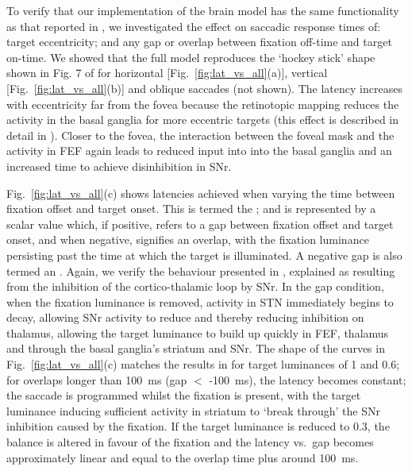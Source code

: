 \documentclass{frontiersSCNS}
\begin{document}
To verify that our implementation of the brain model has the same
functionality as that reported in \cite{cope_basal_2017}, we
investigated the effect on saccadic response times of:
target eccentricity; and any gap or overlap between fixation off-time
and target on-time. We showed that the full model reproduces the
`hockey stick' shape shown in Fig. 7 of \cite{cope_basal_2017} for
horizontal [Fig.~\ref{fig:lat_vs_all}(a)], vertical
[Fig.~\ref{fig:lat_vs_all}(b)] and oblique saccades (not shown). The latency
increases with eccentricity far from the fovea because the retinotopic mapping
reduces the activity in the basal ganglia for more eccentric targets (this
effect is described in detail in \cite{cope_basal_2017}). Closer to the fovea,
the interaction between the foveal mask and the activity in FEF again leads
to reduced input into into the basal ganglia and an increased time to
achieve disinhibition in SNr.

Fig.~\ref{fig:lat_vs_all}(c) shows latencies achieved when varying the time
between fixation offset and target onset. This is termed the ;
and is represented by a scalar value which, if positive, refers to a gap
between fixation offset and target onset, and when negative, signifies an
overlap, with the fixation luminance persisting past the time at which the
target is illuminated. A negative gap is also termed an .
Again, we verify the behaviour
presented in \cite{cope_basal_2017}, explained as resulting from the
inhibition of the cortico-thalamic loop by SNr. In the gap condition, when
the fixation luminance is removed, activity in STN immediately begins to
decay, allowing SNr activity to reduce and thereby reducing inhibition on
thalamus, allowing the target luminance to build up quickly in FEF, thalamus
and through the basal ganglia's striatum and SNr. The shape of the curves in
Fig.~\ref{fig:lat_vs_all}(c) matches the results in \cite{cope_basal_2017}
for target luminances of 1 and 0.6; for overlaps longer than 100~ms
(gap $<$ -100~ms), the latency becomes constant; the saccade is programmed
whilst the fixation is present, with the target luminance inducing sufficient
activity in striatum to `break through' the SNr inhibition caused by the
fixation. If the target luminance is reduced to 0.3, the balance is altered
in favour of the fixation and the latency vs.~gap becomes approximately
linear and equal to the overlap time plus around 100~ms.
\end{document}

